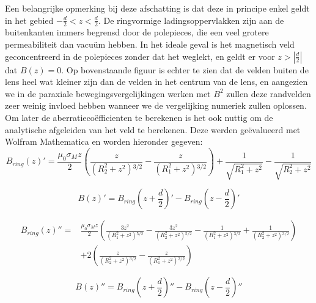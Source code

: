 \documentclass[we,twoside,openright,a4paper,11pt]{uantwerpenbamathesis}
\begin{document}
Een belangrijke opmerking bij deze afschatting is dat deze in principe enkel geldt in het gebied $-\frac{d}{2}<z<\frac{d}{2}$. De ringvormige ladingsoppervlakken zijn aan de buitenkanten immers begrensd door de polepieces, die een veel grotere permeabiliteit dan vacuüm hebben. In het ideale geval is het magnetisch veld geconcentreerd in de polepieces zonder dat het weglekt, en geldt er voor $z>\left|\frac{d}{2}\right|$ dat $B(z)=0$. Op bovenstaande figuur is echter te zien dat de velden buiten de lens heel wat kleiner zijn dan de velden in het centrum van de lens, en aangezien we in de paraxiale bewegingsvergelijkingen werken met $B^2$ zullen deze randvelden zeer weinig invloed hebben wanneer we de vergelijking numeriek zullen oplossen.\\

Om later de aberratiecoëfficienten te berekenen is het ook nuttig om de analytische afgeleiden van het veld te berekenen. Deze werden geëvalueerd met Wolfram Mathematica en worden hieronder gegeven:
\begin{equation}
    B_{ring}(z)'= \frac{\mu_0\sigma_Mz}{2} \left(\frac{z}{\left(R_2^2+z^2\right){}^{3/2}}-\frac{z}{\left(R_1^2+z^2\right){}^{3/2}}\right)+\frac{1}{\sqrt{R_1^2+z^2}}-\frac{1}{\sqrt{R_2^2+z^2}}
\end{equation}

\begin{equation}
    B(z)'= B_{ring}\left(z+\frac{d}{2}\right)' - B_{ring}\left(z-\frac{d}{2}\right)'
\end{equation}

\begin{equation}
\begin{split}
    B_{ring}(z)''= & \frac{\mu_0\sigma_Mz}{2} \left(\frac{3 z^2}{\left(R_1^2+z^2\right){}^{5/2}}-\frac{3 z^2}{\left(R_2^2+z^2\right){}^{5/2}}-\frac{1}{\left(R_1^2+z^2\right){}^{3/2}}+\frac{1}{\left(R_2^2+z^2\right){}^{3/2}}\right)\\
    &+2 \left(\frac{z}{\left(R_2^2+z^2\right){}^{3/2}}-\frac{z}{\left(R_1^2+z^2\right){}^{3/2}}\right)
\end{split}
\end{equation}

\begin{equation}
   B(z)''= B_{ring}\left(z+\frac{d}{2}\right)'' - B_{ring}\left(z-\frac{d}{2}\right)''
\end{equation}
\end{document}
